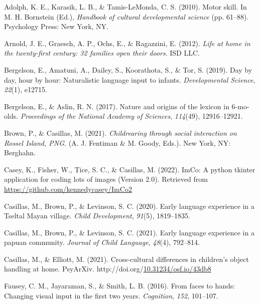 \documentclass[10pt, letterpaper]{article}
\newenvironment{CSLReferences}%
  {}%
  {\par}
\begin{document}
\hypertarget{refs}{}
\begin{CSLReferences}{1}{0}
\leavevmode\hypertarget{ref-adolph2010motor}{}%
Adolph, K. E., Karasik, L. B., \& Tamis-LeMonda, C. S. (2010). Motor
skill. In M. H. Bornstein (Ed.), \emph{Handbook of cultural
developmental science} (pp. 61--88). Psychology Press: New York, NY.

\leavevmode\hypertarget{ref-arnold2012life}{}%
Arnold, J. E., Graesch, A. P., Ochs, E., \& Ragazzini, E. (2012).
\emph{Life at home in the twenty-first century: 32 families open their
doors}. ISD LLC.

\leavevmode\hypertarget{ref-bergelson2019day}{}%
Bergelson, E., Amatuni, A., Dailey, S., Koorathota, S., \& Tor, S.
(2019). Day by day, hour by hour: Naturalistic language input to
infants. \emph{Developmental Science}, \emph{22}(1), e12715.

\leavevmode\hypertarget{ref-bergelson2017nature}{}%
Bergelson, E., \& Aslin, R. N. (2017). Nature and origins of the lexicon
in 6-mo-olds. \emph{Proceedings of the National Academy of Sciences},
\emph{114}(49), 12916--12921.

\leavevmode\hypertarget{ref-brownIPchildrearing}{}%
Brown, P., \& Casillas, M. (2021). \emph{Childrearing through social
interaction on {Rossel Island, PNG}}. (A. J. Fentiman \& M. Goody,
Eds.). New York, NY: Berghahn.

\leavevmode\hypertarget{ref-casey2022imco}{}%
Casey, K., Fisher, W., Tice, S. C., \& Casillas, M. (2022). ImCo: A
python tkinter application for coding lots of images (Version 2.0).
Retrieved from \url{https://github.com/kennedycasey/ImCo2}

\leavevmode\hypertarget{ref-casillas2020early}{}%
Casillas, M., Brown, P., \& Levinson, S. C. (2020). Early language
experience in a {Tseltal Mayan} village. \emph{Child Development},
\emph{91}(5), 1819--1835.

\leavevmode\hypertarget{ref-casillas2021early}{}%
Casillas, M., Brown, P., \& Levinson, S. C. (2021). Early language
experience in a papuan community. \emph{Journal of Child Language},
\emph{48}(4), 792--814.

\leavevmode\hypertarget{ref-casillasURdaylong}{}%
Casillas, M., \& Elliott, M. (2021). Cross-cultural differences in
children's object handling at home. PsyArXiv.
http://doi.org/\href{https://doi.org/10.31234/osf.io/43db8}{10.31234/osf.io/43db8}

\leavevmode\hypertarget{ref-fausey2016faces}{}%
Fausey, C. M., Jayaraman, S., \& Smith, L. B. (2016). From faces to
hands: Changing visual input in the first two years. \emph{Cognition},
\emph{152}, 101--107.


\end{CSLReferences}
\end{document}

